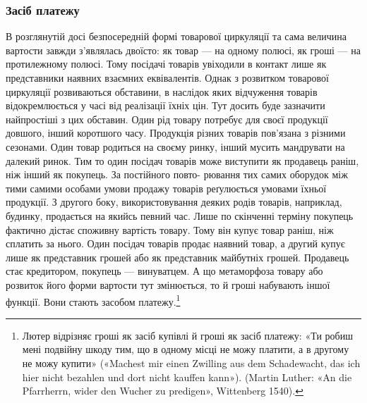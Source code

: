 \subsubsection{Засіб платежу}

В розглянутій досі безпосередній формі товарової циркуляції
та сама величина вартости завжди з’являлась двоїсто: як товар —
на одному полюсі, як гроші — на протилежному полюсі. Тому
посідачі товарів увіходили в контакт лише як представники
наявних взаємних еквівалентів. Однак з розвитком товарової
циркуляції розвиваються обставини, в наслідок яких відчуження
товарів відокремлюється у часі від реалізації їхніх цін. Тут
досить буде зазначити найпростіші з цих обставин. Один рід
товару потребує для своєї продукції довшого, інший коротшого
часу. Продукція різних товарів пов’язана з різними сезонами.
Один товар родиться на своєму ринку, інший мусить мандрувати
на далекий ринок. Тим то один посідач товарів може виступити
як продавець раніш, ніж інший як покупець. За постійного повто-
рювання тих самих оборудок між тими самими особами умови продажу товарів реґулюється умовами їхньої
продукції. З другого боку, використовування деяких родів товарів, наприклад, будинку, продається на
якийсь певний час. Лише по скінченні терміну покупець фактично дістає споживну вартість товару. Тому
він купує товар раніш, ніж сплатить за нього. Один посідач товарів продає наявний товар, а другий
купує лише як представник грошей або як представник майбутніх грошей. Продавець стає кредитором,
покупець — винуватцем. А що метаморфоза товару або розвиток його форми вартости тут змінюється, то й
гроші набувають іншої функції. Вони стають засобом платежу.\footnote{
Лютер відрізняє гроші як засіб купівлі й гроші як засіб платежу:
«Ти робиш мені подвійну шкоду тим, що в одному місці не можу платити,
а в другому не можу купити» («Machest mir einen Zwilling aus dem Schadewacht,
das ich hier nicht bezahlen und dort nicht kauffen kann»). (Martin Luther:
«An die Pfarrherrn, wider den Wucher zu predigen», Wittenberg 1540).
}

